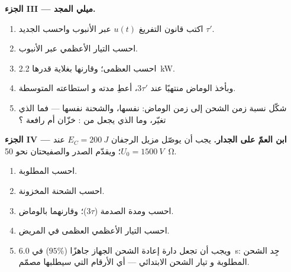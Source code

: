 \begin{problem}
\medskip
\noindent\textbf{الجزء III --- ميلي  المجد.}
\begin{enumerate}[resume]
  \item اكتب قانون التفريغ $u(t)$ عبر الأنبوب واحسب
         الجديد $\tau'$.
  \item احسب التيار الأعظمي عبر الأنبوب.
  \item احسب  العظمى؛ وقارنها بغلاية قدرها \qty{2.2}{kW}.
  \item وبأخذ الوماض منتهيًا عند $3\tau'$، أعطِ مدته و
        استطاعته المتوسطة.
  \item شكّل نسبة زمن الشحن إلى زمن الوماض:  نفسها،
        والشحنة نفسها --- فما الذي تغيّر، وما الذي يجعل من
        : خزّان  أم رافعة ؟
\end{enumerate}

\medskip
\noindent\textbf{الجزء IV --- ابن العمّ على الجدار.}
يجب أن يوصّل مزيل الرجفان $E_C = \qty{200}{J}$ عند
$U_0 = \qty{1500}{V}$؛ ويقدّم الصدر والصفيحتان نحو \qty{50}{\ohm}.
\begin{enumerate}[resume]
  \item احسب  المطلوبة.
  \item احسب الشحنة المخزونة.
  \item احسب  ومدة الصدمة ($3\tau$)؛
        وقارنهما بالوماض.
  \item احسب التيار الأعظمي  العظمى في المريض.
  \item ويجب أن تجعل دارة إعادة الشحن الجهاز جاهزًا ($95\%$) في
        \qty{6.0}{s}: جِد  الشحن المطلوبة و
        تيار الشحن الابتدائي --- أي الأرقام التي سيطلبها مصمّم.
\end{enumerate}
\end{problem}
